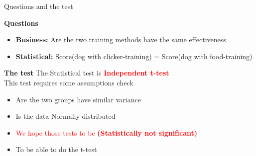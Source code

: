\documentclass[8pt]{beamer}
\begin{document}
        \begin{frame}{Questions and the test}
            \begin{block}{\textbf{Questions}}
                \begin{itemize}
                    \item \textbf{Business:} Are the two training methods have the same effectiveness
                    \item \textbf{Statistical:} Score(dog with clicker-training) = Score(dog with food-training)
                \end{itemize}
            \end{block}

            \begin{block}{\textbf{The test}}
                The Statistical test is \textcolor{red}{\textbf{Independent t-test}}\\
                This test requires some assumptions check \\ 
                \begin{itemize}
                    \item Are the two groups have similar variance 
                    \item Is the data Normally distributed
                    \item \textcolor{red}{We hope those tests to be \textbf{(Statistically not significant)}}
                    \item To be able to do the t-test
                \end{itemize}
            \end{block}
        \end{frame}
\end{document}
